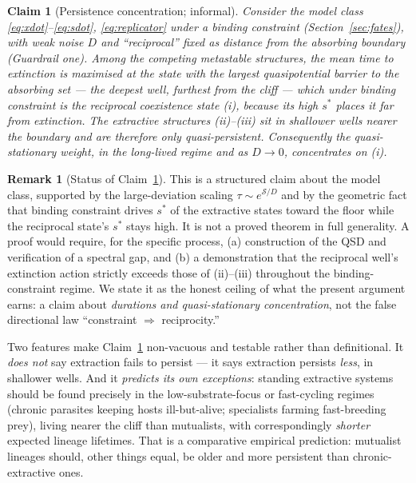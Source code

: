 \documentclass[11pt]{article}
\theoremstyle{plain}
\newtheorem{claim}{Claim}
\theoremstyle{definition}
\newtheorem{remark}{Remark}
\begin{document}
\begin{claim}[Persistence concentration; informal]
\label{claim:persistence}
Consider the model class \eqref{eq:xdot}--\eqref{eq:sdot}, \eqref{eq:replicator} under a binding constraint (Section~\ref{sec:fates}), with weak noise $D$ and ``reciprocal'' fixed as distance from the absorbing boundary (Guardrail one). Among the competing metastable structures, the mean time to extinction is maximised at the state with the largest quasipotential barrier to the absorbing set --- the deepest well, furthest from the cliff --- which under binding constraint is the reciprocal coexistence state (i), because its high $s^\ast$ places it far from extinction. The extractive structures (ii)--(iii) sit in shallower wells nearer the boundary and are therefore only \emph{quasi}-persistent. Consequently the quasi-stationary weight, in the long-lived regime and as $D \to 0$, concentrates on (i).
\end{claim}

\begin{remark}[Status of Claim~\ref{claim:persistence}]
This is a structured claim about the model class, supported by the large-deviation scaling $\tau \sim e^{\mathcal S/D}$ and by the geometric fact that binding constraint drives $s^\ast$ of the extractive states toward the floor while the reciprocal state's $s^\ast$ stays high. It is not a proved theorem in full generality. A proof would require, for the specific process, (a) construction of the QSD and verification of a spectral gap, and (b) a demonstration that the reciprocal well's extinction action strictly exceeds those of (ii)--(iii) throughout the binding-constraint regime. We state it as the honest ceiling of what the present argument earns: a claim about \emph{durations and quasi-stationary concentration}, not the false directional law ``constraint $\Rightarrow$ reciprocity.''
\end{remark}

\noindent Two features make Claim~\ref{claim:persistence} non-vacuous and testable rather than definitional. It \emph{does not} say extraction fails to persist --- it says extraction persists \emph{less}, in shallower wells. And it \emph{predicts its own exceptions}: standing extractive systems should be found precisely in the low-substrate-focus or fast-cycling regimes (chronic parasites keeping hosts ill-but-alive; specialists farming fast-breeding prey), living nearer the cliff than mutualists, with correspondingly \emph{shorter} expected lineage lifetimes. That is a comparative empirical prediction: mutualist lineages should, other things equal, be older and more persistent than chronic-extractive ones.
\end{document}
